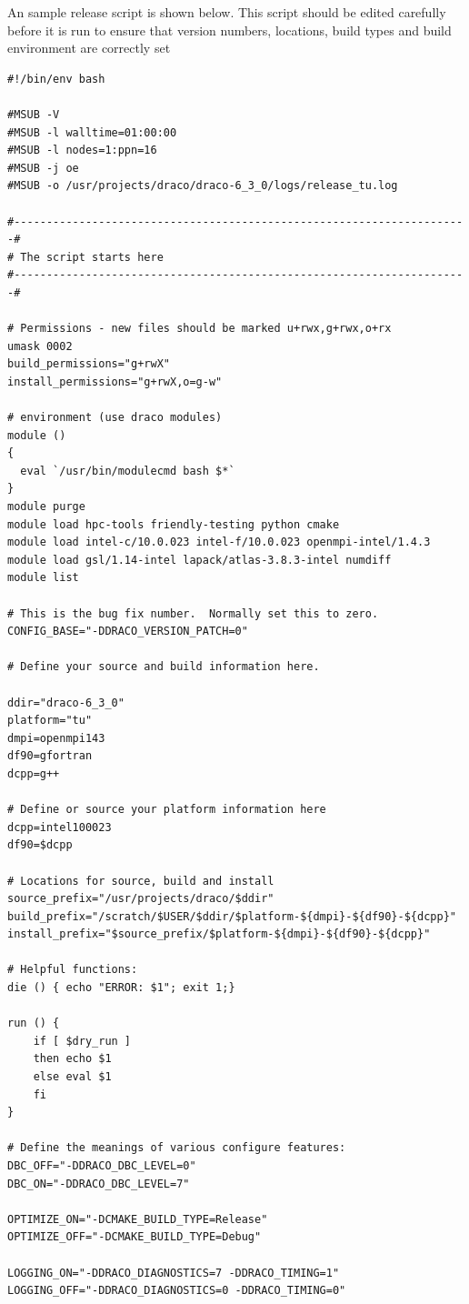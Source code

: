 \documentclass[note]{newmemo}
\begin{document}
%
An sample release script is shown below.  This script should be edited
carefully before it is run to ensure that version numbers, locations,
build types and build environment are correctly set
%
\begin{lstlisting}[basicstyle=\footnotesize, xleftmargin=0.20in, 
  xrightmargin=0.20in]
#!/bin/env bash

#MSUB -V
#MSUB -l walltime=01:00:00
#MSUB -l nodes=1:ppn=16
#MSUB -j oe
#MSUB -o /usr/projects/draco/draco-6_3_0/logs/release_tu.log

#----------------------------------------------------------------------#
# The script starts here
#----------------------------------------------------------------------#

# Permissions - new files should be marked u+rwx,g+rwx,o+rx
umask 0002
build_permissions="g+rwX"
install_permissions="g+rwX,o=g-w"

# environment (use draco modules)
module () 
{
  eval `/usr/bin/modulecmd bash $*` 
}
module purge
module load hpc-tools friendly-testing python cmake
module load intel-c/10.0.023 intel-f/10.0.023 openmpi-intel/1.4.3
module load gsl/1.14-intel lapack/atlas-3.8.3-intel numdiff
module list

# This is the bug fix number.  Normally set this to zero.
CONFIG_BASE="-DDRACO_VERSION_PATCH=0"

# Define your source and build information here.

ddir="draco-6_3_0"
platform="tu"
dmpi=openmpi143
df90=gfortran
dcpp=g++

# Define or source your platform information here
dcpp=intel100023
df90=$dcpp

# Locations for source, build and install
source_prefix="/usr/projects/draco/$ddir"
build_prefix="/scratch/$USER/$ddir/$platform-${dmpi}-${df90}-${dcpp}"
install_prefix="$source_prefix/$platform-${dmpi}-${df90}-${dcpp}"

# Helpful functions:
die () { echo "ERROR: $1"; exit 1;}

run () {
    if [ $dry_run ]
    then echo $1
    else eval $1
    fi
}

# Define the meanings of various configure features:
DBC_OFF="-DDRACO_DBC_LEVEL=0"
DBC_ON="-DDRACO_DBC_LEVEL=7"

OPTIMIZE_ON="-DCMAKE_BUILD_TYPE=Release"
OPTIMIZE_OFF="-DCMAKE_BUILD_TYPE=Debug"

LOGGING_ON="-DDRACO_DIAGNOSTICS=7 -DDRACO_TIMING=1"
LOGGING_OFF="-DDRACO_DIAGNOSTICS=0 -DDRACO_TIMING=0"


\end{lstlisting}
\end{document}
